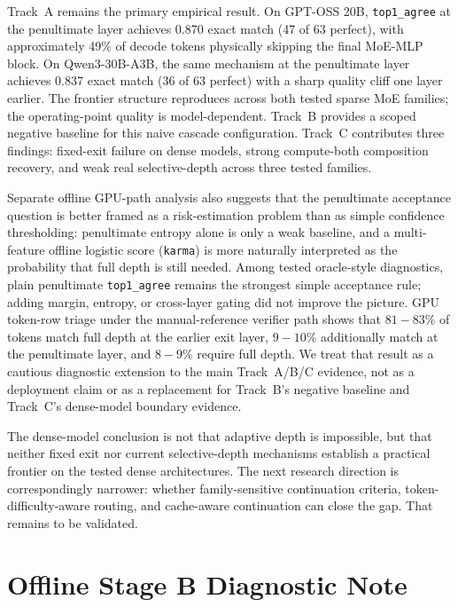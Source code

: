 \documentclass[11pt]{article}
\begin{document}
Track~A remains the primary empirical result. On GPT-OSS 20B, \texttt{top1\_agree} at the penultimate layer achieves 0.870 exact match (47 of 63 perfect), with approximately 49\% of decode tokens physically skipping the final MoE-MLP block. On Qwen3-30B-A3B, the same mechanism at the penultimate layer achieves 0.837 exact match (36 of 63 perfect) with a sharp quality cliff one layer earlier. The frontier structure reproduces across both tested sparse MoE families; the operating-point quality is model-dependent. Track~B provides a scoped negative baseline for this naive cascade configuration. Track~C contributes three findings: fixed-exit failure on dense models, strong compute-both composition recovery, and weak real selective-depth across three tested families.

Separate offline GPU-path analysis also suggests that the penultimate acceptance question is better framed as a risk-estimation problem than as simple confidence thresholding: penultimate entropy alone is only a weak baseline, and a multi-feature offline logistic score (\texttt{karma}) is more naturally interpreted as the probability that full depth is still needed. Among tested oracle-style diagnostics, plain penultimate \texttt{top1\_agree} remains the strongest simple acceptance rule; adding margin, entropy, or cross-layer gating did not improve the picture. GPU token-row triage under the manual-reference verifier path shows that $81\!-\!83\%$ of tokens match full depth at the earlier exit layer, $9\!-\!10\%$ additionally match at the penultimate layer, and $8\!-\!9\%$ require full depth. We treat that result as a cautious diagnostic extension to the main Track~A/B/C evidence, not as a deployment claim or as a replacement for Track~B's negative baseline and Track~C's dense-model boundary evidence.

The dense-model conclusion is not that adaptive depth is impossible, but that neither fixed exit nor current selective-depth mechanisms establish a practical frontier on the tested dense architectures. The next research direction is correspondingly narrower: whether family-sensitive continuation criteria, token-difficulty-aware routing, and cache-aware continuation can close the gap. That remains to be validated.

\appendix

\section{Offline Stage B Diagnostic Note}
\label{app:stageb}
\end{document}

